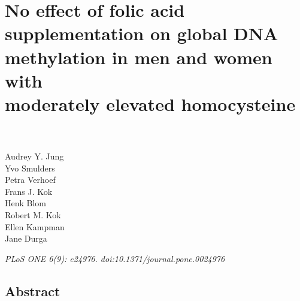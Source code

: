 \chapter[No effect of folic acid supplementation on global DNA methylation in men and women with moderately elevated homocysteine]{No effect of folic acid supplementation on global DNA methylation in men and women with\\moderately elevated homocysteine}
\label{chap4_FACIT} 

\quad\\

\quad\\
\noindent
Audrey Y. Jung\\ 
Yvo Smulders\\ 
Petra Verhoef\\ 
Frans J. Kok\\ 
Henk Blom\\ 
Robert M. Kok\\ 
Ellen Kampman\\ 
Jane Durga\\ 

\begin{table}[b]
\emph{PLoS ONE 6(9): e24976. doi:10.1371/journal.pone.0024976}
\end{table}

\newpage 

\section*{Abstract}

